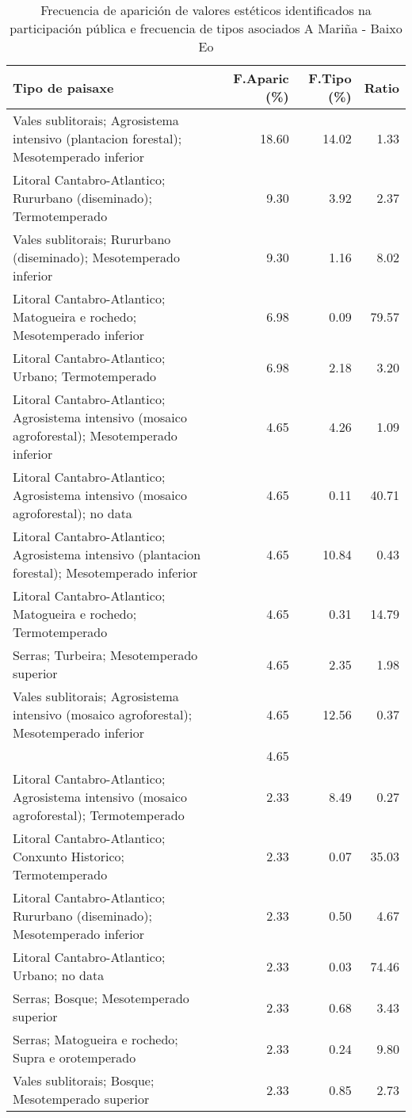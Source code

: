 \begin{table}[p]
\centering
\caption{Frecuencia de aparición de valores estéticos identificados na participación pública e frecuencia de tipos asociados A Mariña - Baixo Eo} 
\label{vsixotest2}
\begin{tabular}{lrrr}
  \hline
Tipo de paisaxe & F.Aparic (\%) & F.Tipo (\%) & Ratio \\ 
  \hline
Vales sublitorais; Agrosistema intensivo (plantacion forestal); Mesotemperado inferior & 18.60 & 14.02 & 1.33 \\ 
  Litoral Cantabro-Atlantico; Rururbano (diseminado); Termotemperado & 9.30 & 3.92 & 2.37 \\ 
  Vales sublitorais; Rururbano (diseminado); Mesotemperado inferior & 9.30 & 1.16 & 8.02 \\ 
  Litoral Cantabro-Atlantico; Matogueira e rochedo; Mesotemperado inferior & 6.98 & 0.09 & 79.57 \\ 
  Litoral Cantabro-Atlantico; Urbano; Termotemperado & 6.98 & 2.18 & 3.20 \\ 
  Litoral Cantabro-Atlantico; Agrosistema intensivo (mosaico agroforestal); Mesotemperado inferior & 4.65 & 4.26 & 1.09 \\ 
  Litoral Cantabro-Atlantico; Agrosistema intensivo (mosaico agroforestal); no data & 4.65 & 0.11 & 40.71 \\ 
  Litoral Cantabro-Atlantico; Agrosistema intensivo (plantacion forestal); Mesotemperado inferior & 4.65 & 10.84 & 0.43 \\ 
  Litoral Cantabro-Atlantico; Matogueira e rochedo; Termotemperado & 4.65 & 0.31 & 14.79 \\ 
  Serras; Turbeira; Mesotemperado superior & 4.65 & 2.35 & 1.98 \\ 
  Vales sublitorais; Agrosistema intensivo (mosaico agroforestal); Mesotemperado inferior & 4.65 & 12.56 & 0.37 \\ 
   & 4.65 &  &  \\ 
  Litoral Cantabro-Atlantico; Agrosistema intensivo (mosaico agroforestal); Termotemperado & 2.33 & 8.49 & 0.27 \\ 
  Litoral Cantabro-Atlantico; Conxunto Historico; Termotemperado & 2.33 & 0.07 & 35.03 \\ 
  Litoral Cantabro-Atlantico; Rururbano (diseminado); Mesotemperado inferior & 2.33 & 0.50 & 4.67 \\ 
  Litoral Cantabro-Atlantico; Urbano; no data & 2.33 & 0.03 & 74.46 \\ 
  Serras; Bosque; Mesotemperado superior & 2.33 & 0.68 & 3.43 \\ 
  Serras; Matogueira e rochedo; Supra e orotemperado & 2.33 & 0.24 & 9.80 \\ 
  Vales sublitorais; Bosque; Mesotemperado superior & 2.33 & 0.85 & 2.73 \\ 
   \hline
\end{tabular}
\end{table}
